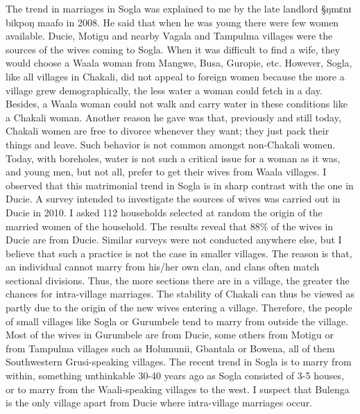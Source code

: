The trend in
marriages in Sogla was explained to me by the late landlord {\S ŋmɛnɪ bikpoŋ
maafo} in 2008. He said that when he was young  there were few women
available.
Ducie, Motigu and nearby  Vagala and Tampulma villages
were the sources of the wives coming to Sogla. When it was difficult to find a
wife, they would
choose a Waala woman from Mangwe, Busa, Guropie, etc. However, Sogla, like all
villages in Chakali, did not appeal  to foreign women because
the more a
village grew demographically, the less water a woman could fetch in a day.
Besides,  a Waala woman could not walk and carry water in these conditions like
a
Chakali woman. Another reason he gave was that, previously and still today,
Chakali
women are free to
divorce whenever they want; they just pack their things and leave. Such 
behavior is not common amongst non-Chakali women. Today, with boreholes,
water is not such a critical issue  for a woman as it was,  and young men, but
not all,
prefer to get their wives from Waala villages. I observed that this matrimonial
 trend
in Sogla is in sharp contrast  with the one in Ducie. A survey intended to
investigate the sources of  wives was carried out in Ducie in 2010. I asked
112 households selected at random the origin of the married women of the
household. The results reveal  that 88\% of the wives in Ducie are
from Ducie. Similar surveys were  not conducted anywhere else, but I
believe that such a
practice  is not the case  in smaller villages. The reason is that,  an
individual
cannot marry from his/her own clan, and clans often match sectional divisions.
Thus, the more sections there are in a village, the greater  the chances for
intra-village
marriages. The stability of Chakali  can thus be viewed as partly due to the
origin of the new wives entering a village. Therefore, the people of small villages like Sogla
or Gurumbele tend to marry from outside the village.  Most of the wives in
Gurumbele are  from
Ducie, some others from Motigu or from Tampulma villages such as Holumunii,
Gbantala or
Bowena, all of them Southwestern Grusi-speaking villages. The recent  trend in
Sogla is to marry from within, something unthinkable 30-40 years ago as Sogla
consisted of 3-5 houses, or to marry from the Waali-speaking villages
to the west. I suspect that Bulenga is the only village apart
from Ducie where
intra-village marriages occur. 


